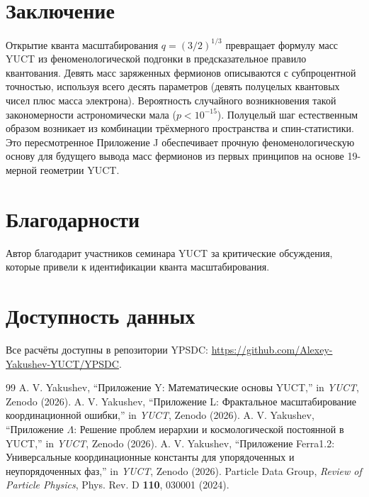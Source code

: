 \documentclass[12pt,a4paper]{article}
\begin{document}
	\section{Заключение}
	
	Открытие кванта масштабирования \(q = (3/2)^{1/3}\) превращает формулу масс YUCT из феноменологической подгонки в предсказательное правило квантования. Девять масс заряженных фермионов описываются с субпроцентной точностью, используя всего десять параметров (девять полуцелых квантовых чисел плюс масса электрона). Вероятность случайного возникновения такой закономерности астрономически мала (\(p < 10^{-15}\)). Полуцелый шаг естественным образом возникает из комбинации трёхмерного пространства и спин-статистики. Это пересмотренное Приложение J обеспечивает прочную феноменологическую основу для будущего вывода масс фермионов из первых принципов на основе 19-мерной геометрии YUCT.
	
	\section*{Благодарности}
	Автор благодарит участников семинара YUCT за критические обсуждения, которые привели к идентификации кванта масштабирования.
	
	\section*{Доступность данных}
	Все расчёты доступны в репозитории YPSDC: \url{https://github.com/Alexey-Yakushev-YUCT/YPSDC}.
	
	\begin{thebibliography}{99}
		 A. V. Yakushev, ``Приложение Y: Математические основы YUCT,'' in \emph{YUCT}, Zenodo (2026).
		 A. V. Yakushev, ``Приложение L: Фрактальное масштабирование координационной ошибки,'' in \emph{YUCT}, Zenodo (2026).
		 A. V. Yakushev, ``Приложение \(\Lambda\): Решение проблем иерархии и космологической постоянной в YUCT,'' in \emph{YUCT}, Zenodo (2026).
		 A. V. Yakushev, ``Приложение Ferra1.2: Универсальные координационные константы для упорядоченных и неупорядоченных фаз,'' in \emph{YUCT}, Zenodo (2026).
		 Particle Data Group, \emph{Review of Particle Physics}, Phys. Rev. D \textbf{110}, 030001 (2024).
	\end{thebibliography}
	
\end{document}
